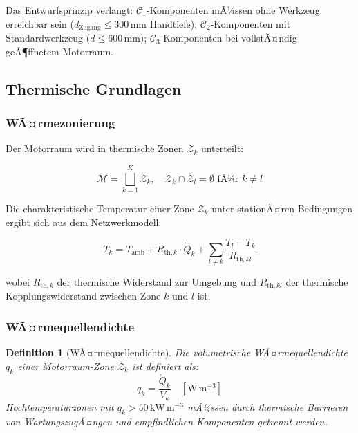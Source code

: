 ﻿\documentclass[12pt,a4paper]{article}
\newtheorem{definition}{Definition}[section]
\begin{document}
Das Entwurfsprinzip verlangt: $\mathcal{C}_1$-Komponenten mÃ¼ssen ohne Werkzeug
erreichbar sein ($d_\mathrm{Zugang} \leq 300\,\mathrm{mm}$ Handtiefe);
$\mathcal{C}_2$-Komponenten mit Standardwerkzeug ($d \leq 600\,\mathrm{mm}$);
$\mathcal{C}_3$-Komponenten bei vollstÃ¤ndig geÃ¶ffnetem Motorraum.

\subsection{Thermische Grundlagen}

\subsubsection{WÃ¤rmezonierung}

Der Motorraum wird in thermische Zonen $\mathcal{Z}_k$ unterteilt:

\begin{equation}
	\mathcal{M} = \bigsqcup_{k=1}^{K} \mathcal{Z}_k, \quad
	\mathcal{Z}_k \cap \mathcal{Z}_l = \emptyset \text{ fÃ¼r } k \neq l
	\label{eq:zonenzerlegung}
\end{equation}

Die charakteristische Temperatur einer Zone $\mathcal{Z}_k$ unter stationÃ¤ren
Bedingungen ergibt sich aus dem Netzwerkmodell:

\begin{equation}
	T_k = T_\mathrm{amb} + R_{\mathrm{th},k} \cdot \dot{Q}_k
	+ \sum_{l \neq k} \frac{T_l - T_k}{R_{\mathrm{th},kl}}
	\label{eq:zonen_temp}
\end{equation}

wobei $R_{\mathrm{th},k}$ der thermische Widerstand zur Umgebung und
$R_{\mathrm{th},kl}$ der thermische Kopplungswiderstand zwischen Zone $k$
und $l$ ist.

\subsubsection{WÃ¤rmequellendichte}

\begin{definition}[WÃ¤rmequellendichte]
	Die volumetrische WÃ¤rmequellendichte $q_k$ einer Motorraum-Zone $\mathcal{Z}_k$
	ist definiert als:
	\begin{equation}
		q_k = \frac{\dot{Q}_k}{V_k} \quad [\mathrm{W\,m^{-3}}]
		\label{eq:waermequelldichte}
	\end{equation}
	Hochtemperaturzonen mit $q_k > 50\,\mathrm{kW\,m^{-3}}$ mÃ¼ssen durch
	thermische Barrieren von WartungszugÃ¤ngen und empfindlichen Komponenten
	getrennt werden.
\end{definition}
\end{document}
